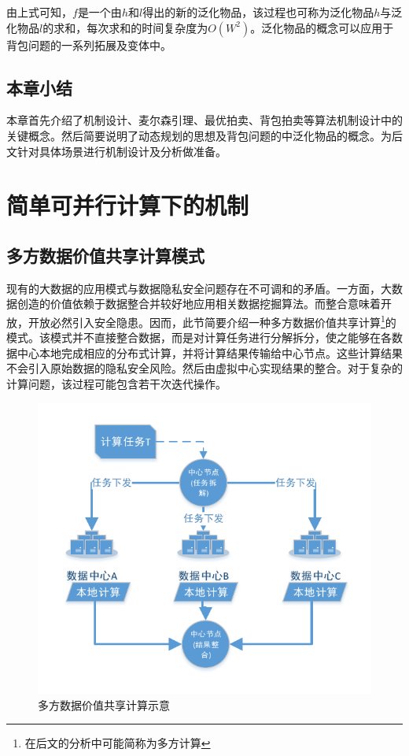\documentclass[promaster]{thesis-uestc}
\begin{document}
由上式可知，$f$是一个由$h$和$l$得出的新的泛化物品，该过程也可称为泛化物品$h$与泛化物品$l$的求和，每次求和的时间复杂度为$O(W^2)$。泛化物品的概念可以应用于背包问题的一系列拓展及变体中。

\section{本章小结}
本章首先介绍了机制设计、麦尔森引理、最优拍卖、背包拍卖等算法机制设计中的关键概念。然后简要说明了动态规划的思想及背包问题的中泛化物品的概念。为后文针对具体场景进行机制设计及分析做准备。

\chapter{简单可并行计算下的机制}
\section{多方数据价值共享计算模式}
现有的大数据的应用模式与数据隐私安全问题存在不可调和的矛盾。一方面，大数据创造的价值依赖于数据整合并较好地应用相关数据挖掘算法。而整合意味着开放，开放必然引入安全隐患。因而，此节简要介绍一种多方数据价值共享计算\footnote{在后文的分析中可能简称为多方计算}的模式。该模式并不直接整合数据，而是对计算任务进行分解拆分，使之能够在各数据中心本地完成相应的分布式计算，并将计算结果传输给中心节点。这些计算结果不会引入原始数据的隐私安全风险。然后由虚拟中心实现结果的整合。对于复杂的计算问题，该过程可能包含若干次迭代操作。
\begin{figure}[h]
\includegraphics[width=350pt]{pic/yuanweishiyi.pdf}
\caption{多方数据价值共享计算示意}
\label{yuanweishiyi}
\end{figure}
\end{document}
